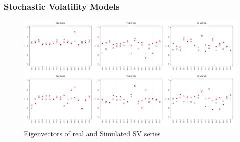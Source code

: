 \documentclass{beamer}
\begin{document}
\begin{frame}
  \frametitle{Stochastic Volatility Models}
  \begin{figure}[htb!]
    \centering
    \includegraphics[width=1.0\linewidth]{FX_sv_eigenvectors.pdf}
    \caption{\scriptsize Eigenvectors of real and Simulated SV series}
  \end{figure}
\end{frame}
\end{document}
